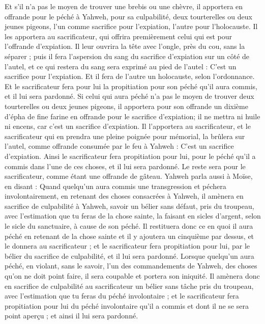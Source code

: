 \begin{multicols}{2}
Et s'il n'a pas le moyen de trouver une brebis ou une chèvre, il apportera en offrande pour le péché à Yahweh, pour sa culpabilité, deux tourterelles ou deux jeunes pigeons, l'un comme sacrifice pour l'expiation, l'autre pour l'holocauste.
Il les apportera au sacrificateur, qui offrira premièrement celui qui est pour l'offrande d'expiation. Il leur ouvrira la tête avec l'ongle, près du cou, sans la séparer ;
puis il fera l'aspersion du sang du sacrifice d'expiation sur un côté de l'autel, et ce qui restera du sang sera exprimé au pied de l'autel : C'est un sacrifice pour l'expiation.
Et il fera de l'autre un holocauste, selon l'ordonnance. Et le sacrificateur fera pour lui la propitiation pour son péché qu'il aura commis, et il lui sera pardonné.
Si celui qui aura péché n'a pas le moyen de trouver deux tourterelles ou deux jeunes pigeons, il apportera pour son offrande un dixième d'épha de fine farine en offrande pour le sacrifice d'expiation; il ne mettra ni huile ni encens, car c'est un sacrifice d'expiation.
Il l'apportera au sacrificateur, et le sacrificateur qui en prendra une pleine poignée pour mémorial, la brûlera sur l'autel, comme offrande consumée par le feu à Yahweh : C'est un sacrifice d'expiation.
Ainsi le sacrificateur fera propitiation pour lui, pour le péché qu'il a commis dans l'une de ces choses, et il lui sera pardonné. Le reste sera pour le sacrificateur, comme étant une offrande de gâteau.
Yahweh parla aussi à Moïse, en disant :
Quand quelqu'un aura commis une transgression et péchera involontairement, en retenant des choses consacrées à Yahweh, il amènera en sacrifice de culpabilité à Yahweh, savoir un bélier sans défaut, pris du troupeau, avec l'estimation que tu feras de la chose sainte, la faisant en sicles d'argent, selon le sicle du sanctuaire, à cause de son péché.
Il restituera donc ce en quoi il aura péché en retenant de la chose sainte et il y ajoutera un cinquième par dessus, et le donnera au sacrificateur ; et le sacrificateur fera propitiation pour lui, par le bélier du sacrifice de culpabilité, et il lui sera pardonné.
Lorsque quelqu'un aura péché, en violant, sans le savoir, l'un des commandements de Yahweh, des choses qu'on ne doit point faire, il sera coupable et portera son iniquité.
 Il amènera donc en sacrifice de culpabilité au sacrificateur un bélier sans tâche pris du troupeau, avec l'estimation que tu feras du péché involontaire ; et le sacrificateur fera propitiation pour lui du péché involontaire qu'il a commis et dont il ne se sera point aperçu ; et ainsi il lui sera pardonné.

\end{multicols}
